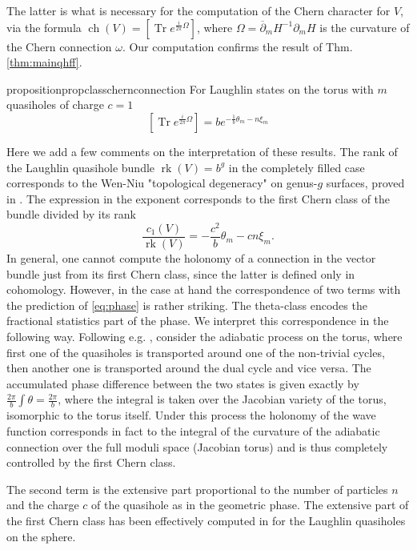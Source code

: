 \documentclass{article}
\theoremstyle{definition}
\DeclareMathOperator{\ch}{ch}
\DeclareMathOperator{\rk}{rk}
\DeclareMathOperator{\tr}{Tr}
\newcommand{\ov}[1]{\overline{#1}}
\begin{document}
The latter is what is necessary for the computation of the Chern character for $V$, via the formula $\ch (V)=[\tr e^{\frac{i}{2\pi}\Omega}]$, where $\Omega= \ov{\partial}_m H^{-1}\partial_m H$ is the curvature of the Chern connection $\omega$. Our computation confirms the result of Thm. \ref{thm:mainqhff}.



\begin{restatable}{proposition}{propclasschernconnection}
\label{prop:classchernconnection}
   For Laughlin states on the torus with $m$ quasiholes of charge $c=1$
    $$[\tr e^{\frac{i}{2\pi}\Omega}]=be^{-\frac{1}{b}\theta_m-n\xi_m}$$
\end{restatable}


Here we add a few comments on the interpretation of these results.
The rank of the Laughlin quasihole bundle $\rk(V)=b^g$ in the completely filled case corresponds to the Wen-Niu \cite{Wen_Niu_1990} "topological degeneracy" on genus-$g$ surfaces, proved in \cite{Klevtsov_Zvonkine_2025}. The expression in the exponent corresponds to the first Chern class of the bundle divided by its rank
$$
\frac{c_1(V)}{\rk (V)}=-\frac{c^2}{b}\theta_m - c n \xi_m.
$$
In general, one cannot compute the holonomy of a connection in the vector bundle just from its first Chern class, since the latter is defined only in cohomology. However, in the case at hand the correspondence of two terms with the prediction of \eqref{eq:phase} is rather striking.  The theta-class encodes the fractional statistics part of the phase. We interpret this correspondence in the following way. Following e.g. \cite[p.52]{Witten_2016}, consider the adiabatic process on the torus, where first one of the quasiholes is transported around one of the non-trivial cycles, then another one is transported around the dual cycle and vice versa. The accumulated phase difference between the two states is given exactly by $\frac{2\pi}b\int\theta=\frac{2\pi}b$, where the integral is taken over the Jacobian variety of the torus, isomorphic to the torus itself. Under this process the holonomy of the wave function corresponds in fact to the integral of the curvature of the adiabatic connection over the full moduli space (Jacobian torus) and is thus completely controlled by the first Chern class.

The second term is the extensive part proportional to the number of particles $n$ and the charge $c$ of the quasihole as in the geometric phase. The extensive part of the first Chern class has been effectively computed in \cite{Read_2008} for the Laughlin quasiholes on the sphere. 
\end{document}
